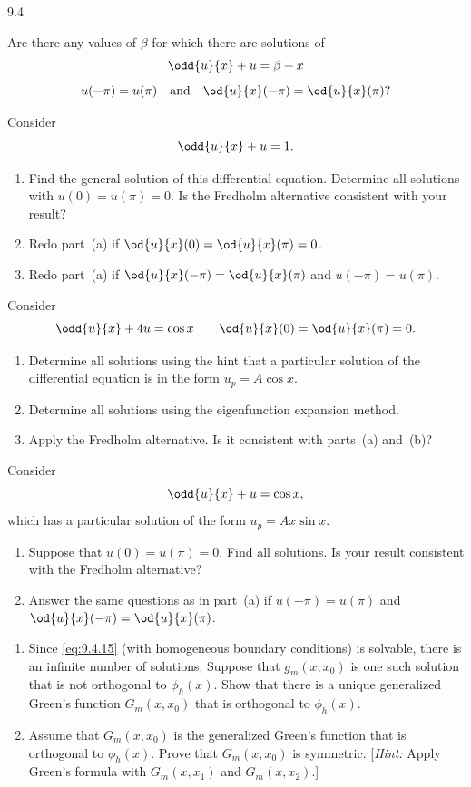 \begin{exercises}{9.4}
\item Are there any values of $\beta$ for which there are solutions of
\[
\odd{u}{x} + u = \beta + x
\]
\[
u(-\pi) = u(\pi) \quad\text{and}\quad \od{u}{x}(-\pi) = \od{u}{x}(\pi)?
\]

\item[\starred 9.4.6.] Consider
\[
\odd{u}{x} + u = 1.
\]
\begin{enumerate}
\item[(a)] Find the general solution of this differential equation.  Determine all solutions with $u(0) = u(\pi) = 0$.  Is the Fredholm alternative consistent with your result?
\item[(b)] Redo part~(a) if $\od{u}{x}(0) = \od{u}{x}(\pi) = 0$.
\item[(c)] Redo part~(a) if $\od{u}{x}(-\pi) = \od{u}{x}(\pi)$ and $u(-\pi) = u(\pi)$.
\end{enumerate}

\item Consider
\[
\odd{u}{x} + 4u = \cos x \qquad \od{u}{x}(0) = \od{u}{x}(\pi) = 0.
\]
\begin{enumerate}
\item[(a)] Determine all solutions using the hint that a particular solution of the differential equation is in the form $u_p = A\cos x$.
\item[(b)] Determine all solutions using the eigenfunction expansion method.
\item[(c)] Apply the Fredholm alternative.  Is it consistent with parts~(a) and~(b)?
\end{enumerate}

\item Consider
\[
\odd{u}{x} + u = \cos x,
\]
which has a particular solution of the form $u_p = Ax\sin x$.
\begin{enumerate}
\item[\starred(a)] Suppose that $u(0) = u(\pi) = 0$.  Find all solutions.  Is your result consistent with the Fredholm alternative?
\item[(b)] Answer the same questions as in part~(a) if $u(-\pi) = u(\pi)$ and $\od{u}{x}(-\pi) = \od{u}{x}(\pi)$.
\end{enumerate}

\item
\begin{enumerate}
\item[(a)] Since \eqref{eq:9.4.15} (with homogeneous boundary conditions) is solvable, there is an infinite number of solutions.  Suppose that $g_m(x,x_0)$ is one such solution that is not orthogonal to $\phi_h(x)$.  Show that there is a unique generalized Green's function $G_m(x,x_0)$ that is orthogonal to $\phi_h(x)$.
\item[(b)] Assume that $G_m(x,x_0)$ is the generalized Green's function that is orthogonal to $\phi_h(x)$.  Prove that $G_m(x,x_0)$ is symmetric.  [\textit{Hint:} Apply Green's formula with $G_m(x,x_1)$ and $G_m(x,x_2)$.]
\end{enumerate}


\end{exercises}
